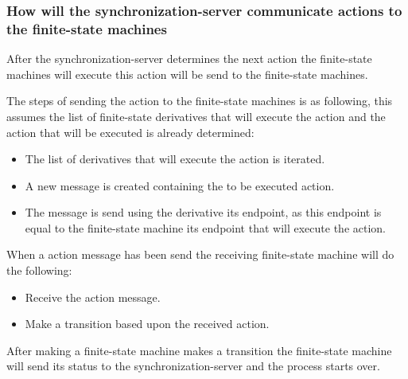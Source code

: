 \hypertarget{how-will-the-synchronization-server-communicate-actions-to-the-finite-state-machines}{%
\subsubsection{How will the synchronization-server communicate actions
to the finite-state
machines}\label{how-will-the-synchronization-server-communicate-actions-to-the-finite-state-machines}}

After the synchronization-server determines the next action the
finite-state machines will execute this action will be send to the
finite-state machines.

The steps of sending the action to the finite-state machines is as
following, this assumes the list of finite-state derivatives that will
execute the action and the action that will be executed is already
determined:

\begin{itemize}
\tightlist
\item
  The list of derivatives that will execute the action is iterated.
\item
  A new message is created containing the to be executed action.
\item
  The message is send using the derivative its endpoint, as this
  endpoint is equal to the finite-state machine its endpoint that will
  execute the action.
\end{itemize}

When a action message has been send the receiving finite-state machine
will do the following:

\begin{itemize}
\tightlist
\item
  Receive the action message.
\item
  Make a transition based upon the received action.
\end{itemize}

After making a finite-state machine makes a transition the finite-state
machine will send its status to the synchronization-server and the
process starts over.
